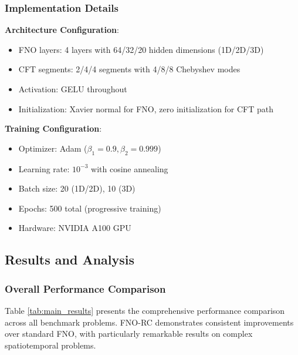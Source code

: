 \documentclass[11pt]{article}
\begin{document}
\subsubsection{Implementation Details}

\textbf{Architecture Configuration}:
\begin{itemize}
\item FNO layers: 4 layers with 64/32/20 hidden dimensions (1D/2D/3D)
\item CFT segments: 2/4/4 segments with 4/8/8 Chebyshev modes
\item Activation: GELU throughout
\item Initialization: Xavier normal for FNO, zero initialization for CFT path
\end{itemize}

\textbf{Training Configuration}:
\begin{itemize}
\item Optimizer: Adam ($\beta_1=0.9, \beta_2=0.999$)
\item Learning rate: $10^{-3}$ with cosine annealing
\item Batch size: 20 (1D/2D), 10 (3D)
\item Epochs: 500 total (progressive training)
\item Hardware: NVIDIA A100 GPU
\end{itemize}

\subsection{Results and Analysis}

\subsubsection{Overall Performance Comparison}

Table \ref{tab:main_results} presents the comprehensive performance comparison across all benchmark problems. FNO-RC demonstrates consistent improvements over standard FNO, with particularly remarkable results on complex spatiotemporal problems.
\end{document}
